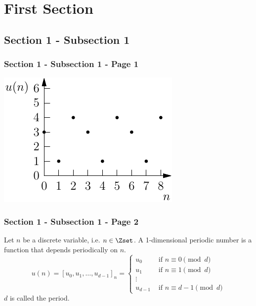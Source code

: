 \section{First Section}
\subsection{Section 1 - Subsection 1}

\begin{frame}\frametitle{Section 1 - Subsection 1 - Page 1}
	\begin{example}
		\begin{minipage}{0.6\textwidth}
			\includegraphics{images/ex1_periodic_number.pdf}
		\end{minipage}
	\end{example}
\end{frame}

\begin{frame}\frametitle{Section 1 - Subsection 1 - Page 2}
	\begin{definition}
		Let $n$ be a discrete variable, i.e. $n\in\Zset$.
		A 1-dimensional periodic number is a function that depends periodically on $n$.
		$$
		u(n)=
		[u_0,u_1,\ldots,u_{d-1}]_n=
		\begin{cases}
			u_0 & \mbox{ if $n\equiv 0 \pmod d$} \\
			u_1 & \mbox{ if $n\equiv 1 \pmod d$} \\
			\vdots \\
			u_{d-1} & \mbox{ if $n\equiv d-1 \pmod d$}
		\end{cases}
		$$
		$d$ is called the period.
	\end{definition}
\end{frame}

